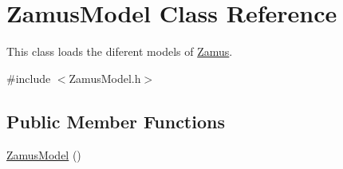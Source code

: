 \hypertarget{classZamusModel}{
\section{ZamusModel Class Reference}
\label{classZamusModel}
}


This class loads the diferent models of \hyperlink{classZamus}{Zamus}.  




{\ttfamily \#include $<$ZamusModel.h$>$}

\subsection*{Public Member Functions}
\begin{DoxyCompactItemize}
\item 
\hyperlink{classZamusModel_a0ad8a2247c734fc57b02a0ecd858e64b}{ZamusModel} ()
\end{DoxyCompactItemize}
